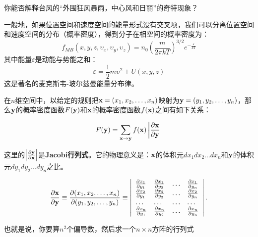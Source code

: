 \documentclass[CJK]{beamer}
\begin{document}
\begin{frame}
\bch
{}
{\Large
你能否解释台风的“外围狂风暴雨，中心风和日丽”的奇特现象？}
\ech
\end{frame}

\begin{frame}
\bch
{\large
一般地，如果位置空间和速度空间的能量形式没有交叉项，我们可以分离位置空间和速度空间的分布（概率密度），得到分子在相空间的概率密度为：
{\blue $$f_{MB}(x, y, z,\upsilon_x, \upsilon_y,\upsilon_z) = n_0 \left(\frac{m}{2\pi kT}\right)^{3/2} e^{-\frac{\varepsilon}{kT}} $$}
其中能量$\varepsilon$是动能与势能之和：
$$\varepsilon = \frac{1}{2}m\upsilon^2 + U(x,y,z)$$
这是著名的{\blue 麦克斯韦-玻尔兹曼能量分布律}。}
\ech
\end{frame}


\begin{frame}
\bch

    {\large
      在$n$维空间中，以给定的规则把${\mathbf{x}} =(x_1,x_2,\ldots,x_n)$映射为${\mathbf{y}} = (y_1,y_2,\ldots,y_n)$，那么${\mathbf{y}}$的概率密度函数$F({\mathbf{y}})$和${\mathbf{x}}$的概率密度函数$f({\mathbf{x}})$之间有如下关系：


      $$F({\mathbf{y}}) = \sum_{{\mathbf{x}} \rightarrow {\mathbf{y}}} f({\mathbf{x}}) \left\vert\frac{\partial {\mathbf{x}}}{\partial {\mathbf{y}}}\right\vert$$
      
      这里的$\left\vert\frac{\partial {\mathbf{y}}}{\partial {\mathbf{x}}}\right\vert$是{\bf Jacobi行列式}。它的物理意义是：${\mathbf{x}}$的体积元$dx_1dx_2\ldots dx_n$和${\mathbf{y}}$的体积元$dy_1dy_2\ldots dy_n$之比。

}
\ech
\end{frame}

\begin{frame}
\bch
{\large
$$ \frac{\partial {\mathbf{x}}}{\partial {\mathbf{y}}} \equiv \frac{\partial (x_1, x_2,\ldots, x_n)}{\partial (y_1, y_2,\ldots, y_n)} \equiv \left\vert
\begin{array}{llll}
  \frac{\partial x_1}{\partial y_1} &   \frac{\partial x_1}{\partial y_2} & \ldots &   \frac{\partial x_1}{\partial y_n}  \\
  \frac{\partial x_2}{\partial y_1} &   \frac{\partial x_2}{\partial y_2} & \ldots &   \frac{\partial x_2}{\partial y_n}  \\
  \ldots & \ldots & \ldots & \ldots \\
  \frac{\partial x_n}{\partial y_1} &   \frac{\partial x_n}{\partial y_2} & \ldots &   \frac{\partial x_n}{\partial y_n}    
\end{array}
\right\vert. $$

也就是说，你要算$n^2$个偏导数，然后求一个$n\times n$方阵的行列式 \bye
}
\ech
\end{frame}
\end{document}

